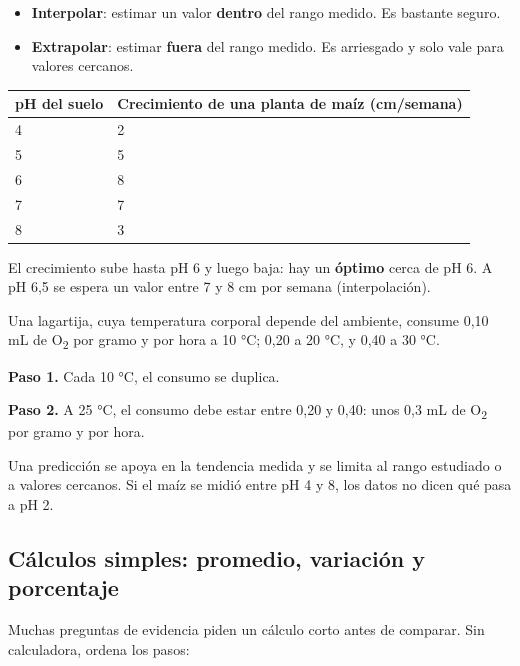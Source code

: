  
\begin{itemize}
  \item \textbf{Interpolar}: estimar un valor \textbf{dentro} del rango medido. Es bastante seguro.
  \item \textbf{Extrapolar}: estimar \textbf{fuera} del rango medido. Es arriesgado y solo vale para valores cercanos.
\end{itemize}
 
\begin{center}\small
\begin{tabular}{@{}ll@{}}
\toprule
\textbf{pH del suelo} & \textbf{Crecimiento de una planta de maíz (cm/semana)} \\
\midrule
4 & 2 \\
5 & 5 \\
6 & 8 \\
7 & 7 \\
8 & 3 \\
\bottomrule
\end{tabular}
\end{center}
 

El crecimiento sube hasta pH 6 y luego baja: hay un \textbf{óptimo} cerca de pH 6. A pH 6,5 se espera un valor entre 7 y 8 cm por semana (interpolación).

  
\begin{ejemplo} Una lagartija, cuya temperatura corporal depende del ambiente, consume 0,10 mL de O\textsubscript{2} por gramo y por hora a 10 °C; 0,20 a 20 °C, y 0,40 a 30 °C.\par \textbf{Paso 1.} Cada 10 °C, el consumo se duplica.\par \textbf{Paso 2.} A 25 °C, el consumo debe estar entre 0,20 y 0,40: unos 0,3 mL de O\textsubscript{2} por gramo y por hora.\end{ejemplo}
 
\begin{clave}[{Recuerda}] Una predicción se apoya en la tendencia medida y se limita al rango estudiado o a valores cercanos. Si el maíz se midió entre pH 4 y 8, los datos no dicen qué pasa a pH 2.\end{clave}
\subsection{Cálculos simples: promedio, variación y porcentaje}
Muchas preguntas de evidencia piden un cálculo corto antes de comparar. Sin calculadora, ordena los pasos:

